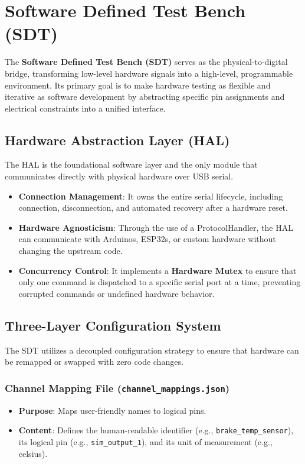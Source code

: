 \documentclass[conference]{IEEEtran}
\begin{document}
\section{Software Defined Test Bench (SDT)}
The \textbf{Software Defined Test Bench (SDT)} serves as the physical-to-digital bridge, transforming low-level hardware signals into a high-level, programmable environment. Its primary goal is to make hardware testing as flexible and iterative as software development by abstracting specific pin assignments and electrical constraints into a unified interface.

\subsection{Hardware Abstraction Layer (HAL)}
The HAL is the foundational software layer and the only module that communicates directly with physical hardware over USB serial.
\begin{itemize}
    \item \textbf{Connection Management}: It owns the entire serial lifecycle, including connection, disconnection, and automated recovery after a hardware reset.
    \item \textbf{Hardware Agnosticism}: Through the use of a ProtocolHandler, the HAL can communicate with Arduinos, ESP32s, or custom hardware without changing the upstream code.
    \item \textbf{Concurrency Control}: It implements a \textbf{Hardware Mutex} to ensure that only one command is dispatched to a specific serial port at a time, preventing corrupted commands or undefined hardware behavior.
\end{itemize}

\subsection{Three-Layer Configuration System}
The SDT utilizes a decoupled configuration strategy to ensure that hardware can be remapped or swapped with zero code changes.
\subsubsection{Channel Mapping File (\texttt{channel\_mappings.json})}
\begin{itemize}
    \item \textbf{Purpose}: Maps user-friendly names to logical pins.
    \item \textbf{Content}: Defines the human-readable identifier (e.g., \texttt{brake\_temp\_sensor}), its logical pin (e.g., \texttt{sim\_output\_1}), and its unit of measurement (e.g., celsius).
\end{itemize}
\end{document}
